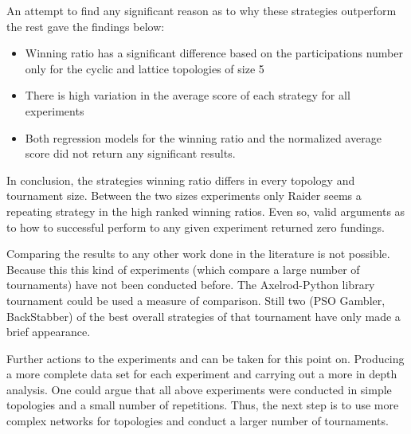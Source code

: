 An attempt to find any significant reason as to why these strategies outperform
the rest gave the findings below:

\begin{itemize}
  \item Winning ratio has a significant difference based on the participations
        number only for the cyclic and lattice topologies of size 5
  \item There is high variation in the average score of each strategy for all
        experiments
  \item Both regression models for the winning ratio and the normalized average
        score did not return any significant results.
\end{itemize}

In conclusion, the strategies winning ratio differs in every topology and
tournament size.
Between the two sizes experiments only Raider seems a repeating strategy in the
high ranked winning ratios. Even so, valid arguments as to how to
successful perform to any given experiment returned zero fundings.

Comparing the results to any other work done in the literature is not possible.
Because this this kind of experiments (which compare a large number of tournaments)
have not been conducted before.
The Axelrod-Python library tournament could be used  a measure of comparison.
Still two (PSO Gambler, BackStabber) of the best overall strategies of that
tournament have only made a brief appearance.

Further actions to the experiments and can be taken for this point on.
Producing a more complete data set for each experiment and carrying out a more
in depth analysis. One could argue that all above experiments
were conducted in simple topologies and a small number of repetitions. Thus, the
next step is to use more complex networks for topologies and conduct a larger
number of tournaments.
